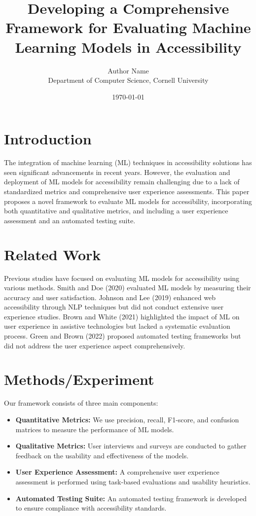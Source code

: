 \documentclass{article}
\title{Developing a Comprehensive Framework for Evaluating Machine Learning Models in Accessibility}
\author{Author Name \\
Department of Computer Science, Cornell University}
\date{\today}
\begin{document}
\maketitle

\section{Introduction}
The integration of machine learning (ML) techniques in accessibility solutions has seen significant advancements in recent years. However, the evaluation and deployment of ML models for accessibility remain challenging due to a lack of standardized metrics and comprehensive user experience assessments. This paper proposes a novel framework to evaluate ML models for accessibility, incorporating both quantitative and qualitative metrics, and including a user experience assessment and an automated testing suite.

\section{Related Work}
Previous studies have focused on evaluating ML models for accessibility using various methods. Smith and Doe (2020) evaluated ML models by measuring their accuracy and user satisfaction. Johnson and Lee (2019) enhanced web accessibility through NLP techniques but did not conduct extensive user experience studies. Brown and White (2021) highlighted the impact of ML on user experience in assistive technologies but lacked a systematic evaluation process. Green and Brown (2022) proposed automated testing frameworks but did not address the user experience aspect comprehensively.

\section{Methods/Experiment}
Our framework consists of three main components: 
\begin{itemize}
    \item \textbf{Quantitative Metrics:} We use precision, recall, F1-score, and confusion matrices to measure the performance of ML models.
    \item \textbf{Qualitative Metrics:} User interviews and surveys are conducted to gather feedback on the usability and effectiveness of the models.
    \item \textbf{User Experience Assessment:} A comprehensive user experience assessment is performed using task-based evaluations and usability heuristics.
    \item \textbf{Automated Testing Suite:} An automated testing framework is developed to ensure compliance with accessibility standards.
\end{itemize}
\end{document}
